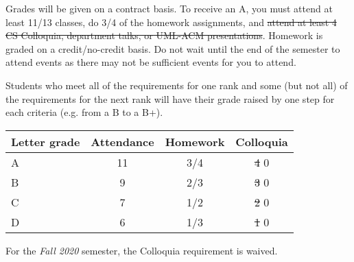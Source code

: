Grades will be given on a contract basis.
To receive an A, you must attend at least 11/13 classes, do 3/4 of the homework assignments, and \st{attend at least 4 CS Colloquia, department talks, or UML-ACM presentations}.  
Homework is graded on a credit/no-credit basis.
Do not wait until the end of the semester to attend events as there may not be sufficient events for you to attend.

Students who meet all of the requirements for one rank and some (but not all) of the requirements for the next rank will have their grade raised by one step for each criteria (e.g. from a B to a B+).

\begin{center}\begin{tabular}{|l|c|c|c|}\hline
    Letter grade & Attendance & Homework & Colloquia\\
    \hline
    A & 11 & 3/4 & \st{4} 0  \\
    B & 9 & 2/3 & \st{3} 0 \\
    C & 7 & 1/2 & \st{2} 0  \\
    D & 6 & 1/3 & \st{1} 0 \\
    \hline
\end{tabular}\end{center}

For the \emph{Fall 2020} semester, the Colloquia requirement is waived.
